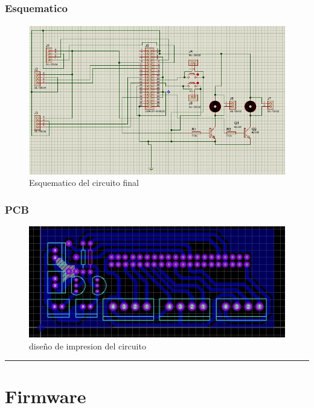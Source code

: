 \documentclass[12pt,a4paper]{article}
\newcommand{\separador}{\vspace{0.5cm}\noindent\rule{\linewidth}{0.5pt}\vspace{0.5cm}}
\begin{document}
\subsubsection{Esquematico}

\begin{figure}[H]
    \centering
\includegraphics[width=\linewidth]{Carpeta tecnica/Captura de pantalla (1).png}
\caption{Esquematico del circuito final}
\end{figure}


\subsubsection{PCB}

\begin{figure}[H]
    \centering
\includegraphics[width=\linewidth]{Carpeta tecnica/nuevo PCB.jpg}
\caption{diseño de impresion del circuito}
\end{figure}

\separador

\section{Firmware}
\end{document}
